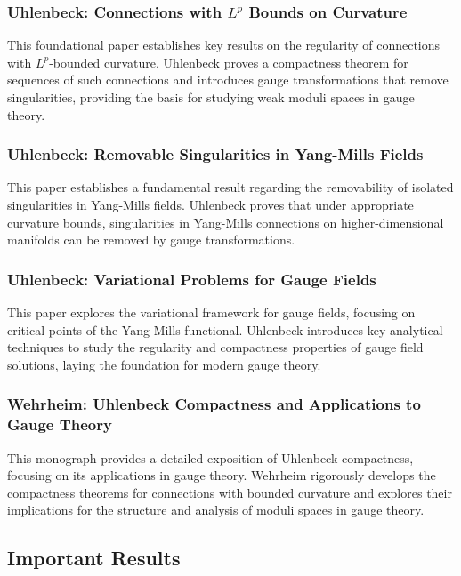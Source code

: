 \documentclass[10pt, letterpaper]{article}
\begin{document}
\subsubsection{Uhlenbeck: Connections with \(L^p\) Bounds on Curvature \cite{uhlenbeck1982connections}} 
This foundational paper establishes key results on the regularity of connections with \(L^p\)-bounded curvature. Uhlenbeck proves a compactness theorem for sequences of such connections and introduces gauge transformations that remove singularities, providing the basis for studying weak moduli spaces in gauge theory.



\subsubsection{Uhlenbeck: Removable Singularities in Yang-Mills Fields \cite{uhlenbeck1982removable}} 
This paper establishes a fundamental result regarding the removability of isolated singularities in Yang-Mills fields. Uhlenbeck proves that under appropriate curvature bounds, singularities in Yang-Mills connections on higher-dimensional manifolds can be removed by gauge transformations.


\subsubsection{Uhlenbeck: Variational Problems for Gauge Fields \cite{uhlenbeck1985variational}} 
This paper explores the variational framework for gauge fields, focusing on critical points of the Yang-Mills functional. Uhlenbeck introduces key analytical techniques to study the regularity and compactness properties of gauge field solutions, laying the foundation for modern gauge theory.


\subsubsection{Wehrheim: Uhlenbeck Compactness and Applications to Gauge Theory \cite{wehrheim2021uhlenbeck}} 
This monograph provides a detailed exposition of Uhlenbeck compactness, focusing on its applications in gauge theory. Wehrheim rigorously develops the compactness theorems for connections with bounded curvature and explores their implications for the structure and analysis of moduli spaces in gauge theory.


\vspace{1cm}

\subsection{Important Results} 
\end{document}
